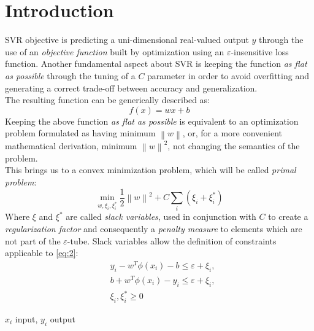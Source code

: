 \documentclass[12pt]{article}
\newcommand{\norm}[1]{\left\lVert#1\right\rVert}
\begin{document}
	\section{Introduction}
	SVR objective is predicting a uni-dimensional real-valued output $y$ through the use of an \textit{objective function} built by optimization using an $\varepsilon$-insensitive loss function. Another fundamental aspect about SVR is keeping the function \textit{as flat as possible} through the tuning of a $C$ parameter in order to avoid overfitting and generating a correct trade-off between accuracy and generalization.\\
	The resulting function can be generically described as:
	\begin{equation}\label{eq:1}
		f(x) = w  x + b
	\end{equation}
	Keeping the above function \textit{as flat as possible} is equivalent to an optimization problem formulated as having minimum $\norm{w}$, or, for a more convenient mathematical derivation, minimum $\norm{w}^2$, not changing the semantics of the problem.\\
	This brings us to a convex minimization problem, which will be called \textit{primal problem}:
    \begin{equation}\label{eq:2}
		\min_{w,\xi_i,\xi_i^*} \frac{1}{2}\norm{w}^2+C\sum_{i}(\xi_{i} + \xi_{i}^*)
	\end{equation}
	Where $\xi$ and $\xi^*$ are called \textit{slack variables}, used in conjunction with $C$ to create a \textit{regularization factor} and consequently a \textit{penalty measure} to elements which are not part of the $\varepsilon$-tube. Slack variables allow the definition of constraints applicable to \eqref{eq:2}:
	\begin{subequations}
    	\begin{align}
    		&y_i - w^T\phi(x_i) - b \leq \varepsilon + \xi_i,  \label{eq:3a}\\ 
    		&b + w^T\phi(x_i) - y_i \leq \varepsilon + \xi_i, \label{eq:3b}\\
    		&\xi_i,\xi_i^*  \geq 0 \label{eq:3c}
    	\end{align}
	\end{subequations}
	\begin{center}
		\footnotesize{$x_i$ input, $y_i$ output}
	\end{center}
	\pagebreak
	
\end{document}
